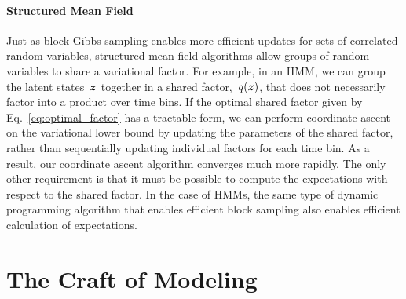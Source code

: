 \paragraph{Structured Mean Field}
Just as block Gibbs sampling enables more efficient updates for sets
of correlated random variables, structured mean field algorithms allow
groups of random variables to share a variational factor.  For
example, in an HMM, we can group the latent states~$\boldsymbol{z}$ together in a
shared factor,~$q(\boldsymbol{z})$, that does not necessarily factor into a
product over time bins.
If the optimal shared factor given by Eq.~\ref{eq:optimal_factor} has
a tractable form, we can perform coordinate ascent on the variational
lower bound by updating the parameters of the shared factor,
rather than sequentially updating individual factors for each time bin.
As a result, our coordinate ascent algorithm converges much more rapidly.
The only other requirement is that it must be possible to compute the
expectations with respect to the shared factor. In the case of HMMs,
the same type of dynamic programming algorithm that enables efficient
block sampling also enables efficient calculation of expectations. 


\section{The Craft of Modeling}
